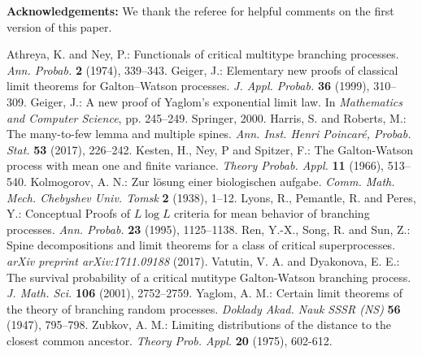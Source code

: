 \documentclass[12pt,a4paper]{amsart}
\numberwithin{equation}{section}
\begin{document}
\noindent
{\bf Acknowledgements:}  We thank the referee for helpful comments on the first version of this paper.
\vspace{.1in}
\begin{thebibliography}{99}
	Athreya, K.  and  Ney, P.:
	Functionals of critical multitype branching processes.
	{\it Ann. Probab.}
	{\bf 2} (1974), 339--343.
	Geiger, J.:
	Elementary new proofs of classical limit theorems for Galton--Watson processes.
	{\it J. Appl. Probab.}
	\textbf{36} (1999), 310--309.
	Geiger, J.:
	A new proof of Yaglom's exponential limit law.
	In {\it Mathematics and Computer Science},
	pp. 245--249. Springer, 2000.
	Harris, S. and Roberts, M.:
	The many-to-few lemma and multiple spines.
	{\it Ann.  Inst. Henri Poincar{\'e}, Probab. Stat.}
	\textbf{53} (2017), 226--242.
	Kesten, H.,  Ney, P and Spitzer, F.:
	The Galton-Watson process with mean one and finite variance.
	{\it Theory Probab. Appl.}
	\textbf{11} (1966), 513--540.
	Kolmogorov, A. N.:
	Zur l{\"o}sung einer biologischen aufgabe.
	{\it Comm. Math. Mech. Chebyshev Univ. Tomsk}
	\textbf{2} (1938), 1--12.
	Lyons, R.,  Pemantle, R. and Peres, Y.:
	Conceptual Proofs of $ L \log L $ criteria for mean behavior of branching processes.
	{\it Ann. Probab.} \textbf{23} (1995), 1125--1138.
	Ren, Y.-X., Song, R. and Sun, Z.:
	Spine decompositions and limit theorems for a class of critical superprocesses.
	{\it arXiv preprint arXiv:1711.09188}
	(2017).
	Vatutin, V. A. and Dyakonova,  E. E.:
	The survival probability of a critical mutitype Galton-Watson branching process.
	{\it J.  Math. Sci.}
	\textbf{106} (2001), 2752--2759.
	Yaglom, A. M.:
	Certain limit theorems of the theory of branching random processes.
	{\it Doklady Akad. Nauk SSSR (NS)}
	\textbf{56} (1947), 795--798.
	Zubkov, A. M.:
	Limiting distributions of the distance to the closest common ancestor.
	{\it Theory Prob. Appl.}
	\textbf{20} (1975), 602-612.

\end{thebibliography}
\end{document}
